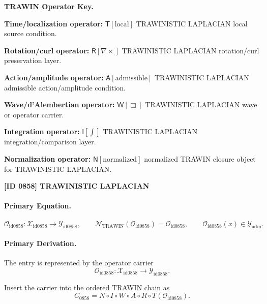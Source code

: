 \par\vspace{0.45\baselineskip}
\noindent\begin{minipage}[t]{\linewidth}
\begingroup
\small
\raggedright
\textbf{TRAWIN Operator Key.}\par
\noindent\textbf{Time/localization operator:} $\mathsf{T}\!\left[\mathrm{local}\right]$ TRAWINISTIC LAPLACIAN local source condition.\par
\noindent\textbf{Rotation/curl operator:} $\mathsf{R}\!\left[\nabla\times\right]$ TRAWINISTIC LAPLACIAN rotation/curl preservation layer.\par
\noindent\textbf{Action/amplitude operator:} $\mathsf{A}\!\left[\mathrm{admissible}\right]$ TRAWINISTIC LAPLACIAN admissible action/amplitude condition.\par
\noindent\textbf{Wave/d'Alembertian operator:} $\mathsf{W}\!\left[\Box\right]$ TRAWINISTIC LAPLACIAN wave or operator carrier.\par
\noindent\textbf{Integration operator:} $\mathsf{I}\!\left[\int\right]$ TRAWINISTIC LAPLACIAN integration/comparison layer.\par
\noindent\textbf{Normalization operator:} $\mathsf{N}\!\left[\mathrm{normalized}\right]$ normalized TRAWIN closure object for TRAWINISTIC LAPLACIAN.\par
\endgroup
\end{minipage}

\clearpage
\noindent\textbf{[ID 0858] TRAWINISTIC LAPLACIAN}\par
\vspace{0.35em}
\paragraph{Primary Equation.}
\[
\mathcal{O}_{\mathrm{id0858}}:\mathcal{X}_{\mathrm{id0858}}\longrightarrow \mathcal{Y}_{\mathrm{id0858}},\qquad
\mathcal{N}_{\mathrm{TRAWIN}}(\mathcal{O}_{\mathrm{id0858}})=\mathcal{O}_{\mathrm{id0858}},\qquad
\mathcal{O}_{\mathrm{id0858}}(x)\in\mathcal{Y}_{\mathrm{adm}}.
\]

\paragraph{Primary Derivation.} The entry is represented by the operator carrier\[
\mathcal{O}_{\mathrm{id0858}}:\mathcal{X}_{\mathrm{id0858}}\longrightarrow \mathcal{Y}_{\mathrm{id0858}}.
\]

Insert the carrier into the ordered TRAWIN chain as\[
C_{0858}=N\circ I\circ W\circ A\circ R\circ T(\mathcal{O}_{\mathrm{id0858}}).
\]

